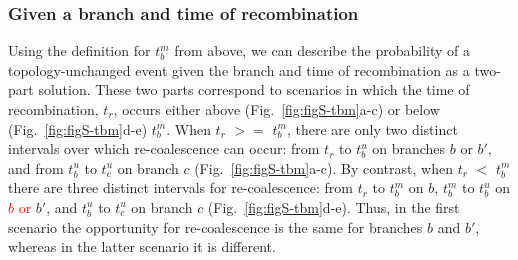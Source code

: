 \documentclass[11pt]{article}
\begin{document}
\subsubsection{Given a branch and time of recombination}
Using the definition for $t_b^m$ from above, we can describe the probability
of a topology-unchanged event given the branch and time of recombination
as a two-part solution. These two parts correspond to scenarios in which
the time of recombination, $t_r$, occurs either above (Fig.~\ref{fig:figS-tbm}a-c)
or below (Fig.~\ref{fig:figS-tbm}d-e) $t_b^m$. When $t_r$ $>=$ $t_b^m$, there
are only two distinct intervals over which re-coalescence can occur: from
$t_r$ to $t_b^u$ on branches $b$ or $b'$, and from $t_b^u$ to $t_c^u$ on 
branch $c$ (Fig.~\ref{fig:figS-tbm}a-c). By contrast, when $t_r$ $<$ $t_b^m$
there are three distinct intervals for re-coalescence: from $t_r$ to $t_b^m$
on $b$, $t_b^m$ to $t_b^u$ on \textcolor{red}{$b$ or} $b'$, and $t_b^u$ to $t_c^u$ on 
branch $c$ (Fig.~\ref{fig:figS-tbm}d-e). Thus, in the first scenario 
the opportunity for re-coalescence is the same for branches $b$ 
and $b'$, whereas in the latter scenario it is different.

\end{document}

